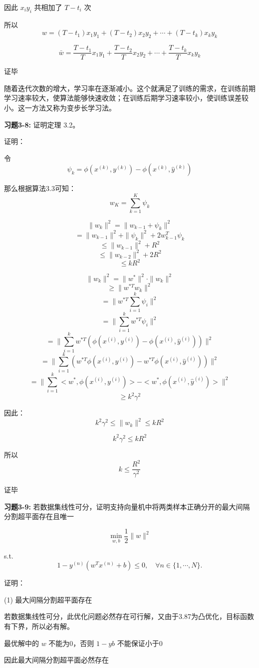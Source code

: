因此 $x_iy_i$ 共相加了 $T - t_i$ 次

所以 \[w = (T-t_1)x_1y_1 + (T-t_2)x_2y_2 + \cdots + (T-t_k)x_ky_k\]

\[\bar{w} = \frac{T-t_1}{T}x_1y_1 + \frac{T-t_2}{T}x_2y_2 + \cdots + \frac{T-t_k}{T}x_ky_k\]

证毕

随着迭代次数的增大，学习率在逐渐减小。这个就满足了训练的需求，在训练前期学习速率较大，使算法能够快速收敛；在训练后期学习速率较小，使训练误差较小。这一方法又称为变步长学习法。


\noindent\textbf{习题3-8:} 证明定理 3.2。

证明：

令 \[\psi_k = \phi(x^{(k)}, y^{(k)}) - \phi(x^{(k)}, \hat{y}^{(k)})\]

那么根据算法3.3可知：\[w_K = \sum_{k=1}^K \psi_k\]

\[\|w_k\|^2 = \|w_{k-1} + \psi_k\|^2\]
\[= \|w_{k-1}\|^2 + \|\psi_k\|^2 + 2w_{k-1}^T\psi_k\]
\[\leq \|w_{k-1}\|^2 + R^2\]
\[\leq \|w_{k-2}\|^2 + 2R^2\]
\[\leq kR^2\]

\[\|w_k\|^2 = \|w^*\|^2 \cdot \|w_k\|^2\]
\[\geq \|w^{*T}w_k\|^2\]
\[= \|w^{*T}\sum_{i=1}^k \psi_i\|^2\]
\[= \|\sum_{i=1}^k w^{*T}\psi_i\|^2\]
\[= \|\sum_{i=1}^k w^{*T}(\phi(x^{(i)}, y^{(i)}) - \phi(x^{(i)}, \hat{y}^{(i)}))\|^2\]
\[= \|\sum_{i=1}^k(w^{*T}\phi(x^{(i)}, y^{(i)}) - w^{*T}\phi(x^{(i)}, \hat{y}^{(i)}))\|^2\]
\[= \|\sum_{i=1}^k < w^*, \phi(x^{(i)}, y^{(i)}) > - < w^*, \phi(x^{(i)}, \hat{y}^{(i)}) > \|^2\]
\[\geq k^2\gamma^2\]

因此：\[k^2\gamma^2 \leq \|w_k\|^2 \leq kR^2\]

\[k^2\gamma^2 \leq kR^2\]

所以 \[k \leq \frac{R^2}{\gamma^2}\]

证毕

\noindent\textbf{习题3-9:} 若数据集线性可分，证明支持向量机中将两类样本正确分开的最大间隔分割超平面存在且唯一

\[\min_{w,b} \frac{1}{2}\|w\|^2\]

s.t. \[1 - y^{(n)}(w^Tx^{(n)} + b) \leq 0, \quad \forall n \in \{1,\cdots,N\}.\]

证明：

(1) 最大间隔分割超平面存在

若数据集线性可分，此优化问题必然存在可行解，又由于3.87为凸优化，目标函数有下界，所以必有解。

最优解中的 $w$ 不能为0，否则 $1-yb$ 不能保证小于0

因此最大间隔分割超平面必然存在

